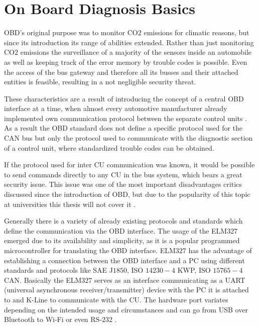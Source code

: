 

\chapter{On Board Diagnosis Basics}
\label{sec:OBDBASICS}
OBD's original purpose was to monitor CO$2$ emissions for climatic reasons, but since its introduction its range of abilities 
extended. Rather than just monitoring CO$2$ emissions the surveillance of a majority of the sensors inside an automobile as well as 
keeping track of the error memory by trouble codes is possible. Even the access of the bus gateway and therefore all its busses and 
their attached entities is feasible, resulting in a not negligible security threat. 

These characteristics are a result of introducing the concept of a central OBD interface at a time, 
when almost every automotive manufacturer already implemented own communication protocol between the separate control units \cite{SCHAFOBD1}.
As a result the OBD standard does not define a specific protocol used for the CAN bus but only the protocol used to communicate with the diagnostic 
section of a control unit, where standardized trouble codes can be obtained. 

If the protocol used for inter CU communication was known, it would be possible to send commands directly to any CU in the bus system, which bears a 
great security issue. This issue was one of the most important disadvantages critics discussed since the introduction of OBD, but due to the
popularity of this topic at universities this thesis will not cover it \cite{Koscher2010}.

Generally there is a variety of already existing protocols and standards which define the communication via the OBD interface. The usage of the ELM$327$
emerged due to its availability and simplicity, as it is a popular programmed microcontroller for translating the OBD interface. ELM$327$ has the 
advantage of establishing a connection between the OBD interface and a PC using different standards and protocols like SAE J$1850$, ISO $14230-4$ KWP, 
ISO $15765-4$ CAN. Basically the ELM$327$ serves as an interface communicating as a UART (universal asynchronous receiver/transmitter) device with the 
PC it is attached to and K-Line to communicate with the CU. The hardware port variates depending on the intended usage and circumstances and can go 
from USB over Bluetooth to Wi-Fi or even RS-$232$ \cite[pp. 46 ff.]{SCHAFOBD2}.

